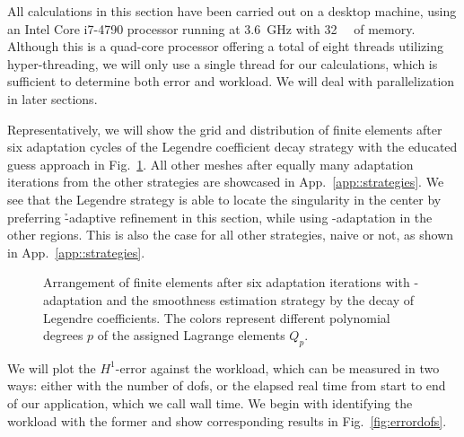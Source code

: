 All calculations in this section have been carried out on a desktop machine, using an Intel\textsuperscript{\textregistered} Core\texttrademark{} i7-4790 processor running at \SI{3.6}{\giga\hertz} with \SI{32}{\giga\byte} of memory. Although this is a quad-core processor offering a total of eight threads utilizing hyper-threading, we will only use a single thread for our calculations, which is sufficient to determine both error and workload. We will deal with parallelization in later sections.



Representatively, we will show the grid and distribution of finite elements after six adaptation cycles of the Legendre coefficient decay strategy with the educated guess approach in Fig.~\ref{fig:fedegrees}. All other meshes after equally many adaptation iterations from the other strategies are showcased in App.~\ref{app::strategies}.
We see that the Legendre strategy is able to locate the singularity in the center by preferring \h-adaptive refinement in this section, while using \p-adaptation in the other regions. This is also the case for all other strategies, naive or not, as shown in App.~\ref{app::strategies}.

\begin{figure}
\centering

\caption[Arrangement of finite elements with the Legendre coefficient decay strategy.]{Arrangement of finite elements after six adaptation iterations with \hp-adaptation and the smoothness estimation strategy by the decay of Legendre coefficients. The colors represent different polynomial degrees $p$ of the assigned Lagrange elements $Q_p$.}
\label{fig:fedegrees}
\end{figure}

We will plot the $H^1$-error against the workload, which can be measured in two ways: either with the number of \glspl{dof}, or the elapsed real time from start to end of our application, which we call wall time. We begin with identifying the workload with the former and show corresponding results in Fig.~\ref{fig:errordofs}.


